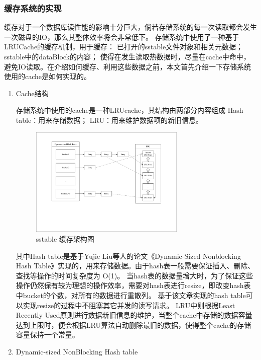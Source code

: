 		\subsubsection{缓存系统的实现}

		缓存对于一个数据库读性能的影响十分巨大，倘若存储系统的每一次读取都会发生一次磁盘的IO，那么其整体效率将会非常低下。
		存储系统中使用了一种基于LRUCache的缓存机制，用于缓存：
		已打开的sstable文件对象和相关元数据；
		sstable中的dataBlock的内容；
		使得在发生读取热数据时，尽量在cache中命中，避免IO读取。在介绍如何缓存、利用这些数据之前，本文首先介绍一下存储系统使用的cache是如何实现的。
		
		\begin{enumerate}
			\item Cache结构 
			
			存储系统中使用的cache是一种LRUcache，其结构由两部分内容组成
			Hash table：用来存储数据；
			LRU：用来维护数据项的新旧信息。

			\begin{figure}[H]
				\centering
				\includegraphics[width=0.70\textwidth]{pdf/cache_arch.pdf}
				\caption{sstable 缓存架构图}
				\label{sstable_cache_arch}
			\end{figure}

			其中Hash table是基于Yujie Liu等人的论文《Dynamic-Sized Nonblocking Hash Table》实现的，用来存储数据。由于hash表一般需要保证插入、删除、查找等操作的时间复杂度为 O(1)。
当hash表的数据量增大时，为了保证这些操作仍然保有较为理想的操作效率，需要对hash表进行resize，即改变hash表中bucket的个数，对所有的数据进行重散列。
基于该文章实现的hash table可以实现resize的过程中不阻塞其它并发的读写请求。
LRU中则根据Least Recently Used原则进行数据新旧信息的维护，当整个cache中存储的数据容量达到上限时，便会根据LRU算法自动删除最旧的数据，使得整个cache的存储容量保持一个常量。


			\item Dynamic-sized NonBlocking Hash table
			

\end{enumerate}
